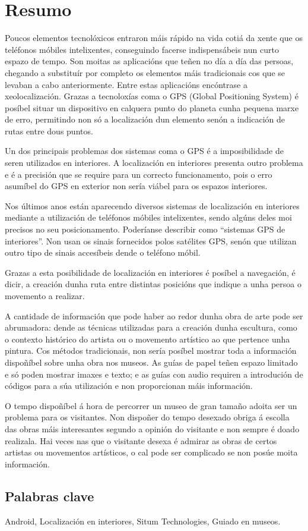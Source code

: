 \chapter*{Resumo}

Poucos elementos tecnolóxicos entraron máis rápido na vida cotiá da xente que os teléfonos móbiles intelixentes, conseguindo facerse indispensábeis nun curto espazo de tempo. Son moitas as aplicacións que teñen no día a día das persoas, chegando a substituír por completo os elementos máis tradicionais cos que se levaban a cabo anteriormente. Entre estas aplicacións encóntrase a xeolocalización. Grazas a tecnoloxías coma o GPS (Global Positioning System) é posíbel situar un dispositivo en calquera punto do planeta cunha pequena marxe de erro, permitindo non só a localización dun elemento senón a indicación de rutas entre dous puntos.

Un dos principais problemas dos sistemas coma o GPS é a imposibilidade de seren utilizados en interiores. A localización en interiores presenta outro problema e é a precisión que se require para un correcto funcionamento, pois o erro asumíbel do GPS en exterior non sería viábel para os espazos interiores.

Nos últimos anos están aparecendo diversos sistemas de localización en interiores mediante a utilización de teléfonos móbiles intelixentes, sendo algúns deles moi precisos no seu posicionamento. Poderíanse describir como “sistemas GPS de interiores”. Non usan os sinais fornecidos polos satélites GPS, senón que utilizan outro tipo de sinais accesíbeis dende o teléfono móbil.

Grazas a esta posibilidade de localización en interiores é posíbel a navegación, é dicir, a creación dunha ruta entre distintas posicións que indique a unha persoa o movemento a realizar.

A cantidade de información que pode haber ao redor dunha obra de arte pode ser abrumadora: dende as técnicas utilizadas para a creación dunha escultura, como o contexto histórico do artista ou o movemento artístico ao que pertence unha pintura. Cos métodos tradicionais, non sería posíbel mostrar toda a información dispoñíbel sobre unha obra nos museos. As guías de papel teñen espazo limitado e só poden mostrar imaxes e texto; e as guías con audio requiren a introdución de códigos para a súa utilización e non proporcionan máis información.

O tempo dispoñíbel á hora de percorrer un museo de gran tamaño adoita ser un problema para os visitantes. Non dispoñer do tempo desexado obriga á escolla das obras máis interesantes segundo a opinión do visitante e non sempre é doado realizala. Hai veces nas que o visitante desexa é admirar as obras de certos artistas ou movementos artísticos, o cal pode ser complicado se non posúe moita información.

\section*{Palabras clave}

Android, Localización en interiores, Situm Technologies, Guiado en museos.
